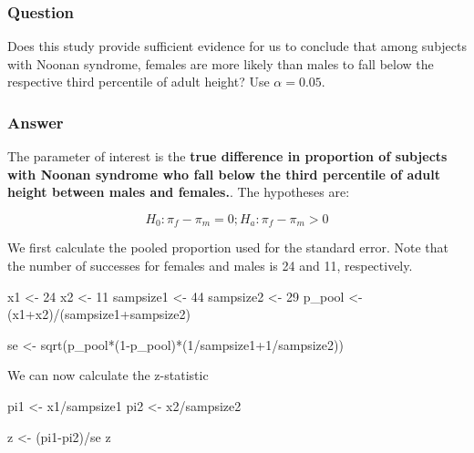 \documentclass[
  letterpaper,
  DIV=11,
  numbers=noendperiod]{scrartcl}
\newenvironment{Shaded}{\begin{snugshade}}{\end{snugshade}}
\newcommand{\DecValTok}[1]{\textcolor[rgb]{0.68,0.00,0.00}{#1}}
\newcommand{\FunctionTok}[1]{\textcolor[rgb]{0.28,0.35,0.67}{#1}}
\newcommand{\NormalTok}[1]{\textcolor[rgb]{0.00,0.23,0.31}{#1}}
\newcommand{\OtherTok}[1]{\textcolor[rgb]{0.00,0.23,0.31}{#1}}
\newcommand{\SpecialCharTok}[1]{\textcolor[rgb]{0.37,0.37,0.37}{#1}}
\begin{document}
\subsubsection{Question}

Does this study provide sufficient evidence for us to conclude that
among subjects with Noonan syndrome, females are more likely than males
to fall below the respective third percentile of adult height? Use
\(\alpha=0.05\).

\subsubsection{Answer}

The parameter of interest is the \textbf{true difference in proportion
of subjects with Noonan syndrome who fall below the third percentile of
adult height between males and females.}. The hypotheses are:

\[
H_0: \pi_f-\pi_m = 0; H_a: \pi_f-\pi_m > 0
\]

We first calculate the pooled proportion used for the standard error.
Note that the number of successes for females and males is 24 and 11,
respectively.

\begin{Shaded}
\begin{Highlighting}[]
\NormalTok{x1 }\OtherTok{\textless{}{-}} \DecValTok{24}
\NormalTok{x2 }\OtherTok{\textless{}{-}} \DecValTok{11}
\NormalTok{sampsize1 }\OtherTok{\textless{}{-}} \DecValTok{44}
\NormalTok{sampsize2 }\OtherTok{\textless{}{-}} \DecValTok{29}
\NormalTok{p\_pool }\OtherTok{\textless{}{-}}\NormalTok{ (x1}\SpecialCharTok{+}\NormalTok{x2)}\SpecialCharTok{/}\NormalTok{(sampsize1}\SpecialCharTok{+}\NormalTok{sampsize2)}

\NormalTok{se }\OtherTok{\textless{}{-}} \FunctionTok{sqrt}\NormalTok{(p\_pool}\SpecialCharTok{*}\NormalTok{(}\DecValTok{1}\SpecialCharTok{{-}}\NormalTok{p\_pool)}\SpecialCharTok{*}\NormalTok{(}\DecValTok{1}\SpecialCharTok{/}\NormalTok{sampsize1}\SpecialCharTok{+}\DecValTok{1}\SpecialCharTok{/}\NormalTok{sampsize2))}
\end{Highlighting}
\end{Shaded}

We can now calculate the z-statistic

\begin{Shaded}
\begin{Highlighting}[]
\NormalTok{pi1 }\OtherTok{\textless{}{-}}\NormalTok{ x1}\SpecialCharTok{/}\NormalTok{sampsize1}
\NormalTok{pi2 }\OtherTok{\textless{}{-}}\NormalTok{ x2}\SpecialCharTok{/}\NormalTok{sampsize2}



\NormalTok{z }\OtherTok{\textless{}{-}}\NormalTok{ (pi1}\SpecialCharTok{{-}}\NormalTok{pi2)}\SpecialCharTok{/}\NormalTok{se}
\NormalTok{z}
\end{Highlighting}
\end{Shaded}
\end{document}
